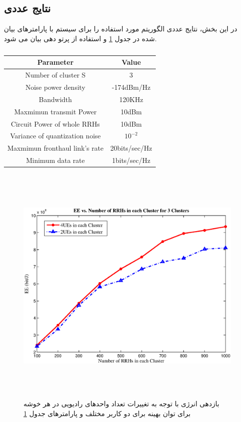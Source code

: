 \subsection{نتایج عددی}
در این بخش، نتایج عددی الگوریتم مورد استفاده را برای سیستم  با پارامترهای بیان شده در جدول \ref{tab:title3} و استفاده از پرتو دهی  بیان می شود.
\begin{latin} 
 \begin{table}[H]
 \caption {} \label{tab:title3} 
 \begin{center}
  \begin{tabular}{||c c ||} 
  \hline
  Parameter & Value \\ [0.5ex] 
  \hline\hline
  Number of cluster S & 3 \\ 
  \hline
  Noise power density & -174dBm/Hz\\
  \hline
  Bandwidth & 120KHz \\
  \hline
 Maxmimun transmit Power & 10dBm \\
  \hline
  Circuit Power of whole RRHs & 10dBm \\
  \hline
  Variance of quantization noise & $10^{-2}$ \\
  \hline
   Maxmimun fronthaul link's rate & 20bits/sec/Hz \\
  \hline
  Minimum data rate &  1bits/sec/Hz \\ [1ex] 
  \hline
 \end{tabular}
 \end{center}
 \end{table}
 \end{latin}
  \begin{figure}[H]
  \centering
    \includegraphics[width=\linewidth, height=12cm]{./fig3/rrhul}
  \caption{
  بازدهی انرژی با توجه به تغییرات تعداد واحدهای رادیویی  در هر خوشه برای توان بهینه  برای 
   دو کاربر مختلف
   و پارامترهای جدول \ref{tab:title3}}
  \label{fig:rrhul}
\end{figure}
